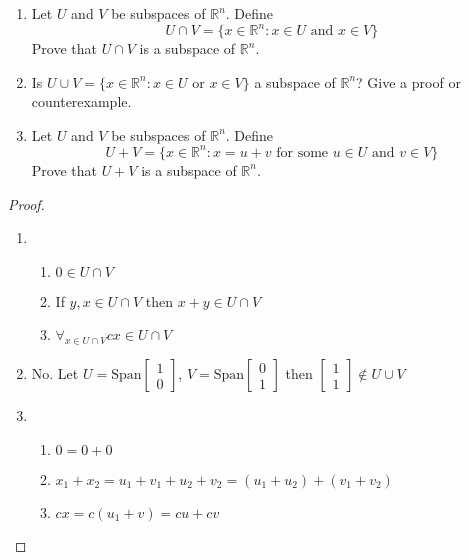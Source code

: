 \begin{exercise} \label{e1.3.6}
    \begin{enumerate}
        \item Let \(U\) and \(V\) be subspaces of \(\mathbb{R}^n\). Define
        \[U \cap V=\{x \in \mathbb{R}^n:x \in U \text{ and } x \in V\}\]
        Prove that \(U\cap V\) is a subspace of \(\mathbb{R}^n\).
        
        \item Is \(U \cup V = \{x \in \mathbb{R}^n:x \in U \text{ or } x \in V\}\) a subspace of \(\mathbb{R}^n\)? Give a proof or counterexample.
        
        \item Let \(U\) and \(V\) be subspaces of \(\mathbb{R}^n\). Define
        \[U+V=\{x \in \mathbb{R}^n: x=u+v \text{ for some } u\in U \text{ and } v\in V\}\]
        Prove that \(U+V\) is a subspace of \(\mathbb{R}^n\).
        
    \end{enumerate}
    
    \begin{proof}
        \begin{enumerate}
            \item
                \begin{enumerate}
                    \item \(0\in U \cap V\)
                    
                    \item If \(y,x\in U\cap V\) then \(x+y\in U \cap V\)
                    
                    \item \(\forall_{x\in U \cap V} cx \in U \cap V\)
                \end{enumerate}
            
            \item No. Let \(U=\text{Span}\begin{bmatrix}1 \\ 0\end{bmatrix}\), \(V=\text{Span}\begin{bmatrix}0 \\ 1\end{bmatrix}\) then \(\begin{bmatrix}1 \\ 1\end{bmatrix} \not\in U \cup V\)
            
            \item 
                \begin{enumerate}
                    \item \(0=0+0\)
                    
                    \item \(x_1+x_2=u_1+v_1+u_2+v_2=(u_1+u_2)+(v_1+v_2)\)
                    
                    \item \(cx=c(u_1+v)=cu+cv\)
                \end{enumerate}
        \end{enumerate}
    \end{proof}
\end{exercise} %

